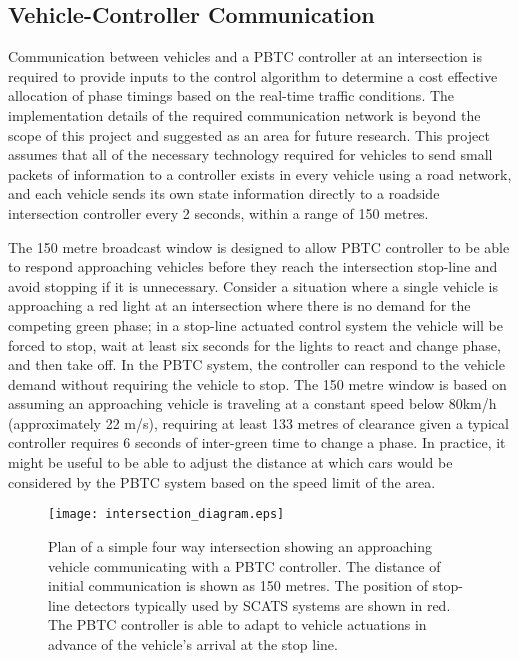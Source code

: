 \subsection{Vehicle-Controller Communication}

Communication between vehicles and a PBTC controller at an intersection is required to provide inputs to the control algorithm to determine a cost effective allocation of phase timings based on the real-time traffic conditions. The implementation details of the required communication network is beyond the scope of this project and suggested as an area for future research. This project assumes that all of the necessary technology required for vehicles to send small packets of information to a controller exists in every vehicle using a road network, and each vehicle sends its own state information directly to a roadside intersection controller every 2 seconds, within a range of 150 metres.

The 150 metre broadcast window is designed to allow PBTC controller to be able to respond approaching vehicles before they reach the intersection stop-line and avoid stopping if it is unnecessary. Consider a situation where a single vehicle is approaching a red light at an intersection where there is no demand for the competing green phase; in a stop-line actuated control system the vehicle will be forced to stop, wait at least six seconds for the lights to react and change phase, and then take off. In the PBTC system, the controller can respond to the vehicle demand without requiring the vehicle to stop. The 150 metre window is based on assuming an approaching vehicle is traveling at a constant speed below 80km/h (approximately 22 m/s), requiring at least 133 metres of clearance given a typical controller requires 6 seconds of inter-green time to change a phase. In practice, it might be useful to be able to adjust the distance at which cars would be considered by the PBTC system based on the speed limit of the area. 

\begin{figure}[]
\centering
	\texttt{[image: intersection\_diagram.eps]}
	\caption[Plan of a simple four way intersection showing an approaching vehicle communicating with a traffic controller.]{ Plan of a simple four way intersection showing an approaching vehicle communicating with a PBTC controller. The distance of initial communication is shown as 150 metres. The position of stop-line detectors typically used by SCATS systems are shown in red. The PBTC controller is able to adapt to vehicle actuations in advance of the vehicle's arrival at the stop line. }
\label{intersectiondiagram}
\end{figure}

